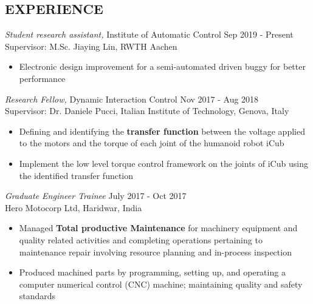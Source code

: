 \documentclass[margin, 10pt]{res} %
\begin{document}
\begin{resume}
\section{EXPERIENCE}

{\sl Student research assistant, }Institute of Automatic Control \hfill Sep 2019 - Present \\
Supervisor: M.Sc. Jiaying Lin, RWTH Aachen\\

\begin{itemize}
	\item  Electronic design improvement for a semi-automated driven buggy for better performance
	
\end{itemize} 

{\sl Research Fellow, }Dynamic Interaction Control \hfill Nov 2017 - Aug 2018 \\
Supervisor: Dr. Daniele Pucci, Italian Institute of Technology, Genova, Italy\\

\begin{itemize}
	\item  Defining and identifying the \textbf{transfer function} between the voltage applied to the motors and the torque of each joint of the humanoid robot iCub
	\item  Implement the low level torque control framework on the joints of iCub using the identified transfer function

\end{itemize} 

{\sl Graduate Engineer Trainee} \hfill July 2017 - Oct 2017 \\
Hero Motocorp Ltd, Haridwar, India\\

\begin{itemize}
	\item Managed \textbf{Total productive Maintenance} for machinery
	equipment and quality related activities and completing operations pertaining to maintenance repair
	involving resource planning and in-process inspection
	\item Produced machined parts by programming, setting up, and operating a computer numerical control (CNC) machine;
	maintaining quality and safety standards


\end{itemize}
\end{resume}
\end{document}
